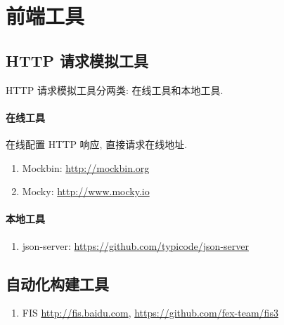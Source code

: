\section{前端工具}

\subsection{HTTP 请求模拟工具}

HTTP 请求模拟工具分两类: 在线工具和本地工具.

\paragraph{在线工具} 在线配置 HTTP 响应, 直接请求在线地址.
\begin{enumerate}
    \item Mockbin: \url{http://mockbin.org}
    \item Mocky: \url{http://www.mocky.io}
\end{enumerate}

\paragraph{本地工具}
\begin{enumerate}
    \item json-server: \url{https://github.com/typicode/json-server}
\end{enumerate}

\subsection{自动化构建工具}

\begin{enumerate}
    \item FIS \url{http://fis.baidu.com}, \url{https://github.com/fex-team/fis3}
\end{enumerate}